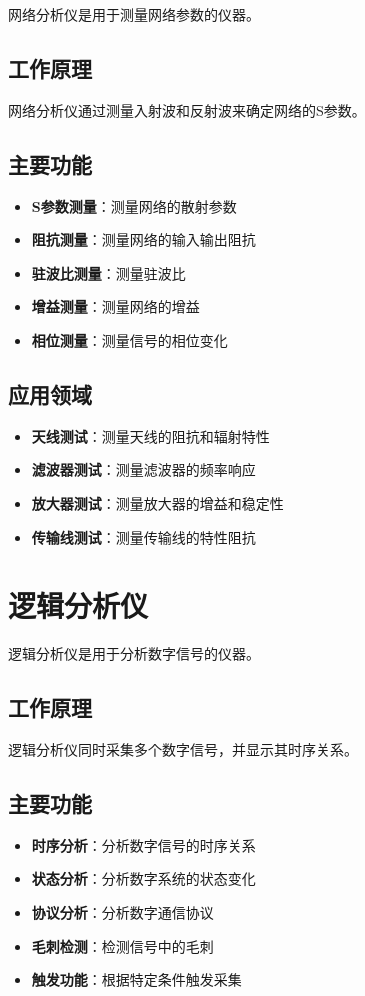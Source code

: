 网络分析仪是用于测量网络参数的仪器。

\subsection{工作原理}

网络分析仪通过测量入射波和反射波来确定网络的S参数。

\subsection{主要功能}
\begin{itemize}
    \item \textbf{S参数测量}：测量网络的散射参数
    \item \textbf{阻抗测量}：测量网络的输入输出阻抗
    \item \textbf{驻波比测量}：测量驻波比
    \item \textbf{增益测量}：测量网络的增益
    \item \textbf{相位测量}：测量信号的相位变化
\end{itemize}

\subsection{应用领域}
\begin{itemize}
    \item \textbf{天线测试}：测量天线的阻抗和辐射特性
    \item \textbf{滤波器测试}：测量滤波器的频率响应
    \item \textbf{放大器测试}：测量放大器的增益和稳定性
    \item \textbf{传输线测试}：测量传输线的特性阻抗
\end{itemize}

\section{逻辑分析仪}
\label{sec:logic_analyzer}

逻辑分析仪是用于分析数字信号的仪器。

\subsection{工作原理}

逻辑分析仪同时采集多个数字信号，并显示其时序关系。

\subsection{主要功能}
\begin{itemize}
    \item \textbf{时序分析}：分析数字信号的时序关系
    \item \textbf{状态分析}：分析数字系统的状态变化
    \item \textbf{协议分析}：分析数字通信协议
    \item \textbf{毛刺检测}：检测信号中的毛刺
    \item \textbf{触发功能}：根据特定条件触发采集
\end{itemize}

